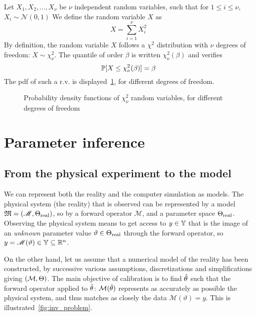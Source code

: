\documentclass[../../Main_ManuscritThese.tex]{subfiles}
\newcommand\imgpath{/home/victor/acadwriting/Manuscrit/Text/Chapter2/img/}
\begin{document}
\begin{example}
  \label{ex:chi2}
  Let $X_1, X_2,\dots,X_{\nu}$ be $\nu$ independent random variables,
  such that for $1\leq i \leq \nu$, $X_i \sim \mathcal{N}(0,1)$ We
  define the random variable $X$ as
  \begin{equation}
    X = \sum_{i=1}^\nu X_i^2
  \end{equation}
  By definition, the random variable $X$ follows a $\chi^2$ distribution with $\nu$ degrees of freedom: $X\sim \chi^2_{\nu}$. The quantile of order $\beta$ is written $\chi^2_{\nu}(\beta)$ and verifies
  \begin{equation}
    \mathbb{P}[X \leq \chi^2_{\nu}(\beta)] = \beta 
  \end{equation}
  The pdf of such a r.v. is displayed~\cref{fig:chi2_examples}, for different degrees of freedom.
\end{example}

\begin{figure}[ht]
  \centering
  
  \caption[Probability density functions of $\chi^2$ r.v.]{Probability density functions of $\chi^2_{\nu}$ random variables, for different degrees of freedom}
  \label{fig:chi2_examples}
\end{figure}

\clearpage

\section{Parameter inference}
\label{sec:parameter_inference}
\subsection{From the physical experiment to the model}
\label{ssec:inv_problem}
We can represent both the reality and the computer simulation as
models.  The physical system (the reality) that is observed can be
represented by a model
$\mathfrak{M}=\left(\mathscr{M},\Theta_{\mathrm{real}}\right)$, so by
a forward operator $\mathscr{M}$, and a parameter space
$\Theta_{\mathrm{real}}$.  Observing the physical system means to get
access to $y\in \mathbb{Y}$ that is the image of an \emph{unknown}
parameter value $\vartheta \in \Theta_{\mathrm{real}}$ through the
forward operator, so
$y = \mathscr{M}(\vartheta)\in \mathbb{Y} \subseteq \mathbb{R}^n$.

On the other hand, let us assume that a numerical model of the reality
has been constructed, by successive various assumptions,
discretizations and simplifications giving $(\mathcal{M},\Theta)$. The
main objective of calibration is to find $\hat{\theta}$ such that the
forward operator applied to $\hat{\theta}$:
$\mathcal{M}(\hat{\theta})$ represents as accurately as possible the
physical system, and thus matches as closely the data
$\mathscr{M}(\vartheta)=y$. This is
illustrated~\cref{fig:inv_problem}.
\end{document}
